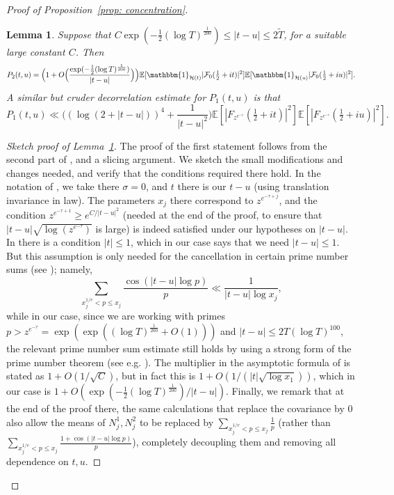 \documentclass[12pt, notitlepage]{amsart}
\numberwithin{equation}{section}
\def\E{\mathbb E}
\def\TT{\widetilde{T}}
\newtheorem{lemma}[theorem]{Lemma}
\theoremstyle{remark}
\theoremstyle{definition}
\theoremstyle{remark}
\numberwithin{equation}{section}
\begin{document}
\begin{proof}[Proof of Proposition~\ref{prop: concentration}]
\begin{lemma}\label{lem: slice} Suppose that $C\exp(-\tfrac 12 (\log T)^{\frac 1{200}}) \le |t-u|\le 2\TT$, for a suitable large constant $C$. Then 
\begin{equation}\label{eqn: p2}
   P_2(t,u) =  \Big(1 + O\Big(\frac{\exp(-\tfrac 12 (\log T)^{\frac 1{200}})}{|t-u| }\Big)\Big) \E[ \mathbbm{1}_{\mathcal{H}(t)} |{\mathcal F}_0(\tfrac 12+it)|^2 ]\E[ \mathbbm{1}_{\mathcal{H}(u)} |{\mathcal F}_0(\tfrac 12+iu)|^2].  
   \end{equation}
A similar but cruder decorrelation estimate for $P_1(t, u)$ is that 
\begin{equation}\label{eqn: p1}
    P_1(t, u)\ll \Big((\log (2+ |t-u|))^4 + \frac{1}{|t-u|^{2}}\Big) \E[|F_{z^{e^{-\tau}}}(\tfrac 12+it)|^{2} ] \E[|F_{z^{e^{-\tau}}}(\tfrac 12+iu)|^{2} ] .
\end{equation}
\end{lemma}
\begin{proof}[Sketch proof of Lemma~\ref{lem: slice}]
The proof of the first statement 
 follows from the second part of \cite[Lemma 7]{HarperLow}, and a slicing argument. We sketch the small modifications and changes needed, and verify that the conditions required there hold.  In the notation of \cite[Lemma 7]{HarperLow}, we take there $\sigma = 0$, and $t$ there is our $t-u$ (using translation invariance in law).  The parameters $x_j$ there correspond to $z^{e^{-\tau + j}}$, and the condition $z^{e^{-\tau + 1}} \geq e^{C/|t-u|^2}$ (needed at the end of the proof, to ensure that $|t-u|\sqrt{\log (z^{e^{-\tau}})}$ is large) is indeed satisfied under our hypotheses on $|t-u|$. In \cite[Lemma 7]{HarperLow}
 there is a condition $|t|\le 1$, which in our case says that we need $|t-u|\le 1$.  But this assumption is only needed for the cancellation in certain prime number sums (see \cite[the end of page 62, published version]{HarperLow}); namely,
\begin{equation}\label{eqn: primesum}
 \sum_{x_j^{1/e} < p \le x_j} \frac{\cos(|t-u| \log p)}{p} \ll \frac{1}{|t-u|\log x_j} ,  
\end{equation}
while in our case, since we are working with primes $p > z^{e^{-\tau}} = \exp(\exp((\log T)^{\frac 1{200}} +O(1) ))$ and $|t-u| \leq 2T (\log T)^{100}$, the relevant prime number sum estimate still holds by using a strong form of the prime number theorem (see e.g. \cite[Number Theory Result 2]{Harperlargevalue}).
The multiplier in the asymptotic formula of \cite[Lemma 7]{HarperLow} is stated as $1+O(1/\sqrt{C})$, but in fact this is $1+O(1/(|t|\sqrt{\log x_1}))$, which in our case is 
$1+O(\exp(-\frac 12 (\log T)^{\frac 1{200}})/{|t-u|})$. Finally, we remark that at the end of the proof there, the same calculations that replace the covariance by 0 also allow the means of $N_{j}^{1}, N_{j}^{2}$ to be replaced by $\sum_{x_j^{1/e} < p \le x_j} \frac{1}{p}$ (rather than $\sum_{x_j^{1/e} < p \le x_j} \frac{1 + \cos(|t-u| \log p)}{p}$), completely decoupling them and removing all dependence on $t,u$.


\end{proof}
\end{proof}
\end{document}
